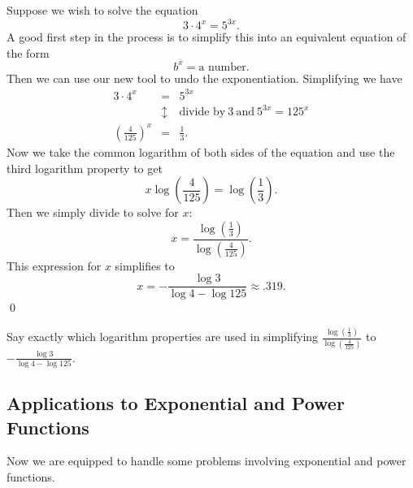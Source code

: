 \begin{eg} Suppose we wish to solve the equation
\[
3\cdot 4^{x} = 5^{3x}.
\]
A good first step in the process is to simplify this into an equivalent equation of the form 
\[
b^{x} = \mbox{a number}.
\]
Then we can use our new tool to undo the exponentiation. Simplifying we have
\begin{eqnarray*}
3\cdot 4^{x} & = & 5^{3x}\\
& \updownarrow & \mbox{divide by}\ 3\  \mbox{and}\  5^{3x}= 125^x\\
\left(\frac{4}{125}\right)^{x} & =& \frac{1}{3}.
\end{eqnarray*}
Now we take the common logarithm of both sides of the equation and use the third logarithm property to get
\[
x\log\left(\frac{4}{125}\right) = \log\left(\frac{1}{3}\right).
\]
Then we simply divide to solve for $x$:
\[
x = \frac{\log\left(\frac{1}{3}\right)}{\log\left(\frac{4}{125}\right)}.
\]
This expression for $x$ simplifies to
\[
x = -\frac{\log{3}}{\log{4}-\log{125}}\approx .319.
\]\qed \end{eg}

\par

\begin{question} Say exactly which logarithm properties are used in simplifying $\frac{\log\left(\frac{1}{3}\right)}{\log\left(\frac{4}{125}\right)}$ to 
$-\frac{\log{3}}{\log{4}-\log{125}}$.
\end{question}

\subsection{Applications to Exponential and Power Functions}

Now we are equipped to handle some problems involving exponential and power functions.

\par

